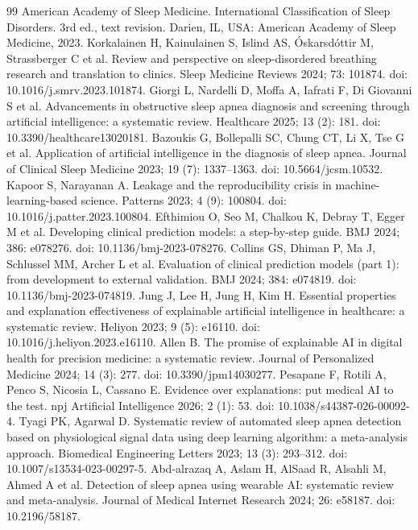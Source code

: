 \documentclass[a4paper,fleqn]{cas-dc}
\begin{document}
\begin{thebibliography}{99}
 American Academy of Sleep Medicine. International Classification of Sleep Disorders. 3rd ed., text revision. Darien, IL, USA: American Academy of Sleep Medicine, 2023.
 Korkalainen H, Kainulainen S, Islind AS, {\'{O}}skarsd{\'{o}}ttir M, Strassberger C et al. Review and perspective on sleep-disordered breathing research and translation to clinics. Sleep Medicine Reviews 2024; 73: 101874. doi: 10.1016/j.smrv.2023.101874.
 Giorgi L, Nardelli D, Moffa A, Iafrati F, Di Giovanni S et al. Advancements in obstructive sleep apnea diagnosis and screening through artificial intelligence: a systematic review. Healthcare 2025; 13 (2): 181. doi: 10.3390/healthcare13020181.
 Bazoukis G, Bollepalli SC, Chung CT, Li X, Tse G et al. Application of artificial intelligence in the diagnosis of sleep apnea. Journal of Clinical Sleep Medicine 2023; 19 (7): 1337--1363. doi: 10.5664/jcsm.10532.
 Kapoor S, Narayanan A. Leakage and the reproducibility crisis in machine-learning-based science. Patterns 2023; 4 (9): 100804. doi: 10.1016/j.patter.2023.100804.
 Efthimiou O, Seo M, Chalkou K, Debray T, Egger M et al. Developing clinical prediction models: a step-by-step guide. BMJ 2024; 386: e078276. doi: 10.1136/bmj-2023-078276.
 Collins GS, Dhiman P, Ma J, Schlussel MM, Archer L et al. Evaluation of clinical prediction models (part 1): from development to external validation. BMJ 2024; 384: e074819. doi: 10.1136/bmj-2023-074819.
 Jung J, Lee H, Jung H, Kim H. Essential properties and explanation effectiveness of explainable artificial intelligence in healthcare: a systematic review. Heliyon 2023; 9 (5): e16110. doi: 10.1016/j.heliyon.2023.e16110.
 Allen B. The promise of explainable AI in digital health for precision medicine: a systematic review. Journal of Personalized Medicine 2024; 14 (3): 277. doi: 10.3390/jpm14030277.
 Pesapane F, Rotili A, Penco S, Nicosia L, Cassano E. Evidence over explanations: put medical AI to the test. npj Artificial Intelligence 2026; 2 (1): 53. doi: 10.1038/s44387-026-00092-4.
 Tyagi PK, Agarwal D. Systematic review of automated sleep apnea detection based on physiological signal data using deep learning algorithm: a meta-analysis approach. Biomedical Engineering Letters 2023; 13 (3): 293--312. doi: 10.1007/s13534-023-00297-5.
 Abd-alrazaq A, Aslam H, AlSaad R, Alsahli M, Ahmed A et al. Detection of sleep apnea using wearable AI: systematic review and meta-analysis. Journal of Medical Internet Research 2024; 26: e58187. doi: 10.2196/58187.

\end{thebibliography}
\end{document}
